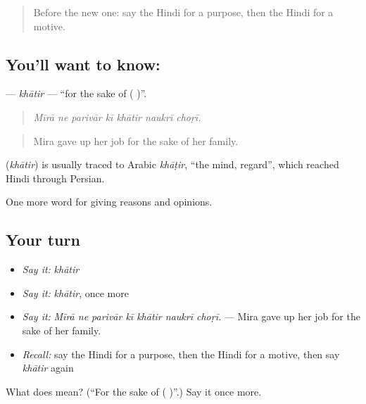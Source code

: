 \begin{quote}
Before the new one: say the Hindi for a purpose, then the Hindi for a motive.
\end{quote}

\subsection*{You'll want to know: }
\textbf{} — \emph{khātir} — \textquotedblleft{}for the sake of ( )\textquotedblright{}.

\begin{quote}
      
\end{quote}

\begin{quote}
\emph{Mīrā ne parivār kī khātir naukrī choṛī.}
\end{quote}

\begin{quote}
Mira gave up her job for the sake of her family.
\end{quote}

\begin{cousinweb}
\textbf{} (\emph{khātir}) is usually traced to Arabic \emph{khāṭir}, \textquotedblleft{}the mind, regard\textquotedblright{}, which reached Hindi through Persian.
\end{cousinweb}

\begin{grammarlens}[title={What you've built}]
One more word for giving reasons and opinions.
\end{grammarlens}

\subsection*{Your turn}
\begin{itemize}
\raggedright
  \item \emph{Say it:} \emph{khātir}
  \item \emph{Say it:} \emph{khātir}, once more
  \item \emph{Say it:} \emph{Mīrā ne parivār kī khātir naukrī choṛī.} — Mira gave up her job for the sake of her family.
  \item \emph{Recall:} say the Hindi for a purpose, then the Hindi for a motive, then say \emph{khātir} again
\end{itemize}

\begin{tcolorbox}[breakable,colback=teal!4,colframe=teal!35!black,title={Before you move on}]
What does  mean? (\textquotedblleft{}For the sake of ( )\textquotedblright{}.) Say it once more.
\end{tcolorbox}
